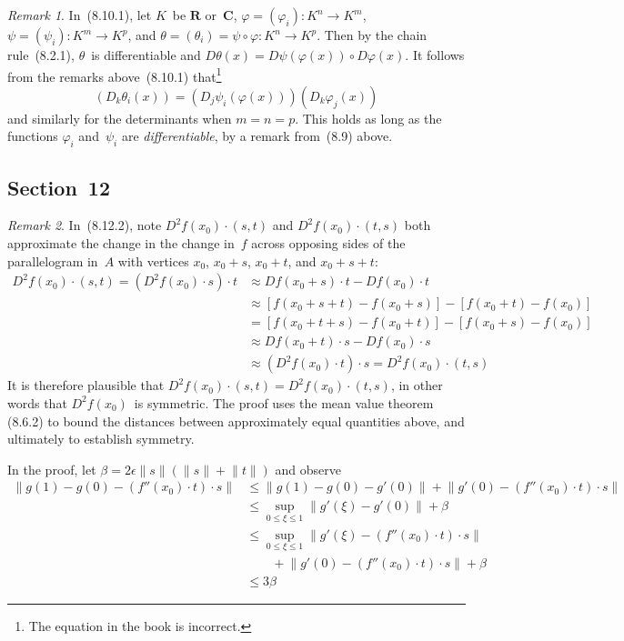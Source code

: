 \documentclass[letterpaper,12pt]{article}
\newcommand{\R}{\mathbf{R}}
\newcommand{\C}{\mathbf{C}}
\newcommand{\after}{\circ}
\newcommand{\at}{\cdot}
\newcommand{\norm}[1]{\lVert{#1}\rVert}
\theoremstyle{plain}
\theoremstyle{definition}
\theoremstyle{remark}
\newtheorem*{rmk}{Remark}
\begin{document}
\begin{rmk}
In~(8.10.1), let \(K\)~be \(\R\) or~\(\C\), \(\varphi=(\varphi_i):K^n\to K^m\), \(\psi=(\psi_i):K^m\to K^p\), and \(\theta=(\theta_i)=\psi\after\varphi:K^n\to K^p\). Then by the chain rule~(8.2.1), \(\theta\)~is differentiable and \(D\theta(x)=D\psi(\varphi(x))\after D\varphi(x)\). It follows from the remarks above~(8.10.1) that\footnote{The equation in the book is incorrect.}
\[(D_k\theta_i(x))=(D_j\psi_i(\varphi(x)))(D_k\varphi_j(x))\]
and similarly for the determinants when \(m=n=p\). This holds as long as the functions \(\varphi_i\) and~\(\psi_i\) are \emph{differentiable}, by a remark from~(8.9) above.
\end{rmk}

\subsection*{Section~12}
\begin{rmk}
In~(8.12.2), note \(D^2f(x_0)\at(s,t)\) and \(D^2f(x_0)\at(t,s)\) both approximate the change in the change in~\(f\) across opposing sides of the parallelogram in~\(A\) with vertices \(x_0\), \(x_0+s\), \(x_0+t\), and \(x_0+s+t\):
\begin{align*}
D^2f(x_0)\at(s,t)=(D^2f(x_0)\at s)\at t&\approx Df(x_0+s)\at t-Df(x_0)\at t\\
	&\approx[f(x_0+s+t)-f(x_0+s)]-[f(x_0+t)-f(x_0)]\\
	&=[f(x_0+t+s)-f(x_0+t)]-[f(x_0+s)-f(x_0)]\\
	&\approx Df(x_0+t)\at s-Df(x_0)\at s\\
	&\approx(D^2f(x_0)\at t)\at s=D^2f(x_0)\at(t,s)
\end{align*}
It is therefore plausible that \(D^2f(x_0)\at(s,t)=D^2f(x_0)\at(t,s)\), in other words that \(D^2f(x_0)\)~is symmetric. The proof uses the mean value theorem (8.6.2) to bound the distances between approximately equal quantities above, and ultimately to establish symmetry.

In the proof, let \(\beta=2\epsilon\norm{s}(\norm{s}+\norm{t})\) and observe
\begin{align*}
\norm{g(1)-g(0)-(f''(x_0)\at t)\at s}&\le\norm{g(1)-g(0)-g'(0)}+\norm{g'(0)-(f''(x_0)\at t)\at s}\\
	&\le\sup_{0\le\xi\le 1}\norm{g'(\xi)-g'(0)}+\beta\\
	&\le\sup_{0\le\xi\le 1}\norm{g'(\xi)-(f''(x_0)\at t)\at s}\\
	&\qquad+\norm{g'(0)-(f''(x_0)\at t)\at s}+\beta\\
	&\le3\beta
\end{align*}
\end{rmk}
\end{document}
